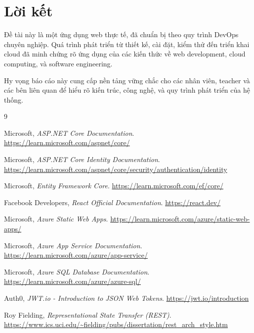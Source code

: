 \documentclass[12pt,a4paper,oneside]{report}
\begin{document}
\section{Lời kết}

Đề tài này là một ứng dụng web thực tế, đã chuẩn bị theo quy trình DevOps chuyên nghiệp.
Quá trình phát triển từ thiết kế, cài đặt, kiểm thử đến triển khai cloud đã minh chứng rõ
ứng dụng của các kiến thức về web development, cloud computing, và software engineering.

Hy vọng báo cáo này cung cấp nền tảng vững chắc cho các nhân viên, teacher và các bên liên quan
để hiểu rõ kiến trúc, công nghệ, và quy trình phát triển của hệ thống.


\begin{thebibliography}{9}

Microsoft, \textit{ASP.NET Core Documentation}. 
\url{https://learn.microsoft.com/aspnet/core/}

Microsoft, \textit{ASP.NET Core Identity Documentation}. 
\url{https://learn.microsoft.com/aspnet/core/security/authentication/identity}

Microsoft, \textit{Entity Framework Core}. 
\url{https://learn.microsoft.com/ef/core/}

Facebook Developers, \textit{React Official Documentation}. 
\url{https://react.dev/}

Microsoft, \textit{Azure Static Web Apps}. 
\url{https://learn.microsoft.com/azure/static-web-apps/}

Microsoft, \textit{Azure App Service Documentation}. 
\url{https://learn.microsoft.com/azure/app-service/}

Microsoft, \textit{Azure SQL Database Documentation}. 
\url{https://learn.microsoft.com/azure/azure-sql/}

Auth0, \textit{JWT.io - Introduction to JSON Web Tokens}. 
\url{https://jwt.io/introduction}

Roy Fielding, \textit{Representational State Transfer (REST)}. 
\url{https://www.ics.uci.edu/~fielding/pubs/dissertation/rest_arch_style.htm}

\end{thebibliography}

\end{document}
